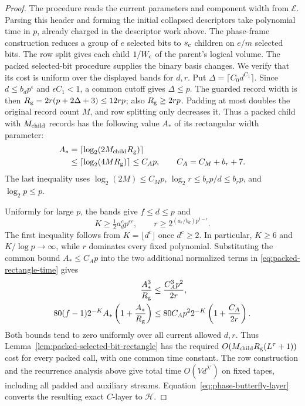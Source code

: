 \begin{proof}
The procedure reads the current parameters and component width from
$\mathcal E$. Parsing this header and forming the initial collapsed
descriptors take polynomial time in $p$, already charged in the
descriptor work above.
The phase-frame construction reduces a group of $e$ selected bits to
$s_{\rm c}$ children on $e/m$ selected bits.  The row split gives
each child $1/W_{\rm c}$ of the parent's logical volume. The packed
selected-bit procedure supplies the binary basis changes. We verify
that its cost is uniform over the displayed bands for $d,r$.
Put $\Delta=\lceil C_0d^{C_1}\rceil$. Since $d\le b_dp^\epsilon$
and $\epsilon C_1<1$, a common cutoff gives $\Delta\le p$. The guarded
record width is then
$R_{\rm g}=2r(p+2\Delta+3)\le12rp$; also $R_{\rm g}\ge2rp$.
Padding at most doubles the original record count $M$, and row splitting
only decreases it. Thus a packed child with $M_{\rm child}$ records has
the following value $A_*$ of its rectangular width parameter:
\[
\begin{split}
 A_*
 &=\lceil\log_2(2M_{\rm child}R_{\rm g})\rceil\\
 &\le\lceil\log_2(4MR_{\rm g})\rceil\le C_Ap,
 \qquad C_A=C_M+b_r+7.
\end{split}
\]
The last inequality uses $\log_2(2M)\le C_Mp$,
$\log_2r\le b_rp/d\le b_rp$, and $\log_2p\le p$.

Uniformly for large $p$, the bands give $f\le d\le p$ and
\[
 K\ge\tfrac12a_d^c p^{\epsilon c},\qquad
 r\ge2^{(a_r/b_d)p^{1-\epsilon}}.
\]
The first inequality follows from $K=\lfloor d^c\rfloor$ once
$d^c\ge2$. In particular, $K\ge6$ and $K/\log p\to\infty$, while
$r$ dominates every fixed polynomial. Substituting the common bound
$A_*\le C_Ap$ into the two additional normalized
terms in \eqref{eq:packed-rectangle-time} gives
\[
\begin{aligned}
 \frac{A_*^3}{R_{\rm g}}
 &\le\frac{C_A^3p^2}{2r},\\
 80(f-1)2^{-K}A_*\left(1+\frac{A_*}{R_{\rm g}}\right)
 &\le80C_Ap^2 2^{-K}\left(1+\frac{C_A}{2r}\right).
\end{aligned}
\]
Both bounds tend to zero uniformly over all current allowed $d,r$.
Thus Lemma~\ref{lem:packed-selected-bit-rectangle} has the required
$O(M_{\rm child}R_{\rm g}(L^\tau+1))$ cost for every packed call,
with one common time constant.
The row construction and the recurrence analysis
above give total time $O(Vd^{\lambda'})$ on fixed tapes, including
all padded and auxiliary streams. Equation~\eqref{eq:phase-butterfly-layer}
converts the resulting exact $C$-layer to $\mathcal H$.


\end{proof}
